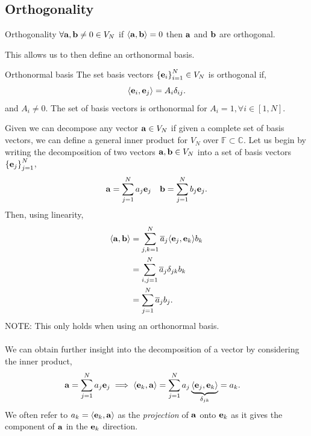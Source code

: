 \documentclass{book}
\def\innerproduct#1#2{{\langle #1},{#2 \rangle}}
\begin{document}
\subsection{Orthogonality}
\begin{Definitions}{Orthogonality}{}
	$\forall \vb{a},\vb{b} \neq 0 \in V_N$ if $\innerproduct{\vb{a}}{\vb{b}} = 0$ then $\vb{a}$ and $\vb{b}$ are orthogonal.
\end{Definitions}
This allows us to then define an orthonormal basis.
\begin{Definitions}{Orthonormal basis}{}
	The set basis vectors $\left\{\vb{e}_i\right\}_{i=1}^N \in V_N$ is orthogonal if,
	\begin{equation}
		\innerproduct{\vb{e}_i}{\vb{e}_j} = A_i\delta_{ij}.
	\end{equation}
	and $A_i \neq 0$. The set of basis vectors is orthonormal for $A_i = 1, \forall i \in \left[1,N\right]$.
\end{Definitions}
Given we can decompose any vector $\vb{a} \in V_N$ if given a complete set of basis vectors, we can define a general inner product for $V_N$ over $\mathbb{F} \subset \mathbb{C}$. Let us begin by writing the decomposition of two vectors $\vb{a},\vb{b}\in V_N$ into a set of basis vectors $\left\{\vb{e}_j\right\}_{j=1}^N$,
\begin{align}
	\vb{a} = \sum_{j=1}^Na_j\vb{e}_j && \vb{b} = \sum_{j=1}^Nb_j\vb{e}_j.
\end{align}
Then, using linearity,
\begin{equation}
	\begin{split}
		\innerproduct{\vb{a}}{\vb{b}} & = \sum_{j,k=1}^N\overline{a}_j \innerproduct{\vb{e}_j}{\vb{e}_k}b_k \\
		& = \sum_{i,j=1}^N\overline{a}_j\delta_{jk}b_k \\
		& = \sum_{j=1}^N\overline{a}_jb_j.
	\end{split}
\end{equation}
NOTE: This only holds when using an orthonormal basis.
\\\\
We can obtain further insight into the decomposition of a vector by considering the inner product,
\begin{equation}
	\begin{split}
		\vb{a} = \sum_{j=1}^Na_j\vb{e}_j \implies \innerproduct{\vb{e}_k}{\vb{a}} & = \sum_{j=1}^Na_j\underbrace{\innerproduct{\vb{e}_j}{\vb{e}_k}}_{\delta_{jk}} = a_k.
	\end{split}
\end{equation}
We often refer to $a_k = \innerproduct{\vb{e}_k}{\vb{a}}$ as the \textit{projection} of $\vb{a}$ onto $\vb{e}_k$ as it gives the component of $\vb{a}$ in the $\vb{e}_k$ direction.
\end{document}
